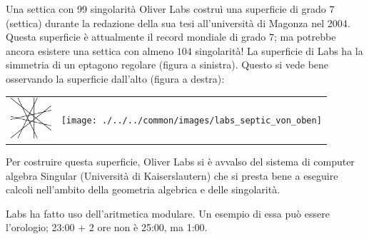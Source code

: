 \begin{surferPage}{Una settica con 99 singolarit\`a}
    Oliver Labs costru\`i una superficie di grado $7$ (settica) durante la redazione della sua
    tesi all'universit\`a di Magonza nel 2004. Questa superficie \`e attualmente il record mondiale di grado $7$; ma potrebbe ancora esistere una settica con almeno $104$
    singolarit\`a!  
    La superficie di Labs ha la simmetria di un eptagono regolare (figura a sinistra).
    Questo si vede bene osservando la superficie dall'alto (figura a destra):

    \vspace*{-0.3em}
    \begin{center}
      \begin{tabular}{c@{\qquad}c}
        \includegraphics[height=1.5cm]{./../../common/images/labsseptic1.pdf}
        &
        \texttt{[image: ./../../common/images/labs\_septic\_von\_oben]}
      \end{tabular}
    \end{center}
    \vspace*{-0.3em}

    Per costruire questa superficie, Oliver Labs si \`e avvalso del sistema di computer algebra
    {\sc Singular} (Universit\`a di Kaiserslautern) che si presta bene a eseguire calcoli nell'ambito della geometria algebrica e delle singolarit\`a.

    Labs ha fatto uso dell'aritmetica modulare. Un esempio di essa pu\`o essere l'orologio; 23:00 $+$ 2 ore non
    \`e 25:00, ma 1:00.
\end{surferPage}

